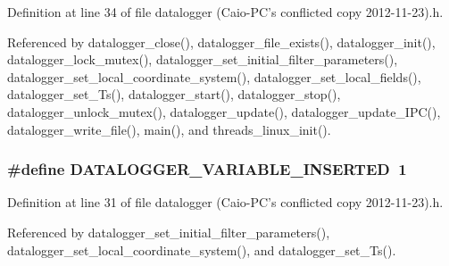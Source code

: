 Definition at line 34 of file datalogger (\-Caio-\/\-P\-C's conflicted copy 2012-\/11-\/23).\-h.



Referenced by datalogger\-\_\-close(), datalogger\-\_\-file\-\_\-exists(), datalogger\-\_\-init(), datalogger\-\_\-lock\-\_\-mutex(), datalogger\-\_\-set\-\_\-initial\-\_\-filter\-\_\-parameters(), datalogger\-\_\-set\-\_\-local\-\_\-coordinate\-\_\-system(), datalogger\-\_\-set\-\_\-local\-\_\-fields(), datalogger\-\_\-set\-\_\-\-Ts(), datalogger\-\_\-start(), datalogger\-\_\-stop(), datalogger\-\_\-unlock\-\_\-mutex(), datalogger\-\_\-update(), datalogger\-\_\-update\-\_\-\-I\-P\-C(), datalogger\-\_\-write\-\_\-file(), main(), and threads\-\_\-linux\-\_\-init().

\hypertarget{datalogger_01_07Caio-PC's_01conflicted_01copy_012012-11-23_08_8h_a181f9a0649abd26c74ed1a8a1710e25f}{
\subsubsection[{D\-A\-T\-A\-L\-O\-G\-G\-E\-R\-\_\-\-V\-A\-R\-I\-A\-B\-L\-E\-\_\-\-I\-N\-S\-E\-R\-T\-E\-D}]{\setlength{\rightskip}{0pt plus 5cm}\#define D\-A\-T\-A\-L\-O\-G\-G\-E\-R\-\_\-\-V\-A\-R\-I\-A\-B\-L\-E\-\_\-\-I\-N\-S\-E\-R\-T\-E\-D~1}}\label{datalogger_01_07Caio-PC's_01conflicted_01copy_012012-11-23_08_8h_a181f9a0649abd26c74ed1a8a1710e25f}


Definition at line 31 of file datalogger (\-Caio-\/\-P\-C's conflicted copy 2012-\/11-\/23).\-h.



Referenced by datalogger\-\_\-set\-\_\-initial\-\_\-filter\-\_\-parameters(), datalogger\-\_\-set\-\_\-local\-\_\-coordinate\-\_\-system(), and datalogger\-\_\-set\-\_\-\-Ts().

